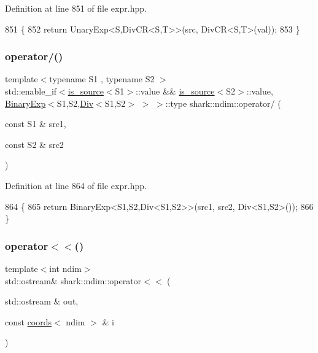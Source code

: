 Definition at line 851 of file expr.\+hpp.


\begin{DoxyCode}
851                                                                                                            
                                    \{
852             \textcolor{keywordflow}{return} UnaryExp<S,DivCR<S,T>>(src, DivCR<S,T>(val));
853         \}
\end{DoxyCode}
\hypertarget{namespaceshark_1_1ndim_a1116e694b5847cfeee2bbd30f6451659}{}\label{namespaceshark_1_1ndim_a1116e694b5847cfeee2bbd30f6451659} 
\subsubsection{\texorpdfstring{operator/()}{operator/()}\hspace{0.1cm}{\footnotesize\ttfamily [5/5]}}
{\footnotesize\ttfamily template$<$typename S1 , typename S2 $>$ \\
std\+::enable\+\_\+if$<$\hyperlink{classshark_1_1ndim_1_1is__source}{is\+\_\+source}$<$S1$>$\+::value \&\& \hyperlink{classshark_1_1ndim_1_1is__source}{is\+\_\+source}$<$S2$>$\+::value, \hyperlink{classshark_1_1ndim_1_1_binary_exp}{Binary\+Exp}$<$S1,S2,\hyperlink{classshark_1_1ndim_1_1_div}{Div}$<$S1,S2$>$ $>$ $>$\+::type shark\+::ndim\+::operator/ (\begin{DoxyParamCaption}\item[{const S1 \&}]{src1,  }\item[{const S2 \&}]{src2 }\end{DoxyParamCaption})}



Definition at line 864 of file expr.\+hpp.


\begin{DoxyCode}
864                                                                                                            
                                              \{
865             \textcolor{keywordflow}{return} BinaryExp<S1,S2,Div<S1,S2>>(src1, src2, Div<S1,S2>());
866         \}
\end{DoxyCode}
\hypertarget{namespaceshark_1_1ndim_a2b5f024bd72953162e3cb106e9cc9940}{}\label{namespaceshark_1_1ndim_a2b5f024bd72953162e3cb106e9cc9940} 
\subsubsection{\texorpdfstring{operator$<$$<$()}{operator<<()}\hspace{0.1cm}{\footnotesize\ttfamily [1/5]}}
{\footnotesize\ttfamily template$<$int ndim$>$ \\
std\+::ostream\& shark\+::ndim\+::operator$<$$<$ (\begin{DoxyParamCaption}\item[{std\+::ostream \&}]{out,  }\item[{const \hyperlink{structshark_1_1ndim_1_1coords}{coords}$<$ ndim $>$ \&}]{i }\end{DoxyParamCaption})}

